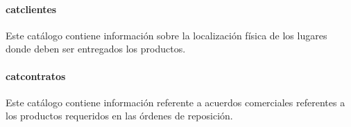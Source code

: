 \paragraph{cat{\textunderscore}clientes\\} Este catálogo contiene información sobre la localización física de los lugares donde deben ser entregados los productos.
\paragraph{cat{\textunderscore}contratos\\} Este catálogo contiene información referente a acuerdos comerciales referentes a los productos requeridos en las órdenes de reposición.


%
%
%
%
%
%
%
%
%
%
%
%
%
%
%
%
